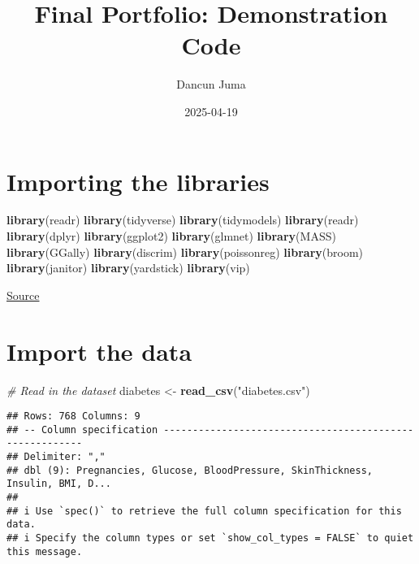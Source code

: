 \documentclass[
]{article}
\title{Final Portfolio: Demonstration Code}
\author{Dancun Juma}
\date{2025-04-19}
\newenvironment{Shaded}{\begin{snugshade}}{\end{snugshade}}
\newcommand{\CommentTok}[1]{\textcolor[rgb]{0.56,0.35,0.01}{\textit{#1}}}
\newcommand{\FunctionTok}[1]{\textcolor[rgb]{0.13,0.29,0.53}{\textbf{#1}}}
\newcommand{\NormalTok}[1]{#1}
\newcommand{\OtherTok}[1]{\textcolor[rgb]{0.56,0.35,0.01}{#1}}
\newcommand{\StringTok}[1]{\textcolor[rgb]{0.31,0.60,0.02}{#1}}
\begin{document}
\maketitle

{
\setcounter{tocdepth}{2}
\tableofcontents
}
\section{Importing the libraries}\label{importing-the-libraries}

\begin{Shaded}
\begin{Highlighting}[]
\FunctionTok{library}\NormalTok{(readr)}
\FunctionTok{library}\NormalTok{(tidyverse)}
\FunctionTok{library}\NormalTok{(tidymodels)}
\FunctionTok{library}\NormalTok{(readr)}
\FunctionTok{library}\NormalTok{(dplyr)}
\FunctionTok{library}\NormalTok{(ggplot2)}
\FunctionTok{library}\NormalTok{(glmnet)}
\FunctionTok{library}\NormalTok{(MASS)}
\FunctionTok{library}\NormalTok{(GGally)}
\FunctionTok{library}\NormalTok{(discrim)}
\FunctionTok{library}\NormalTok{(poissonreg)}
\FunctionTok{library}\NormalTok{(broom)}
\FunctionTok{library}\NormalTok{(janitor)}
\FunctionTok{library}\NormalTok{(yardstick)}
\FunctionTok{library}\NormalTok{(vip)}
\end{Highlighting}
\end{Shaded}

\href{https://www.kaggle.com/datasets/mathchi/diabetes-data-set?resource=download}{Source}

\section{Import the data}\label{import-the-data}

\begin{Shaded}
\begin{Highlighting}[]
\CommentTok{\# Read in the dataset}
\NormalTok{diabetes }\OtherTok{\textless{}{-}} \FunctionTok{read\_csv}\NormalTok{(}\StringTok{"diabetes.csv"}\NormalTok{)}
\end{Highlighting}
\end{Shaded}

\begin{verbatim}
## Rows: 768 Columns: 9
## -- Column specification --------------------------------------------------------
## Delimiter: ","
## dbl (9): Pregnancies, Glucose, BloodPressure, SkinThickness, Insulin, BMI, D...
## 
## i Use `spec()` to retrieve the full column specification for this data.
## i Specify the column types or set `show_col_types = FALSE` to quiet this message.
\end{verbatim}
\end{document}

